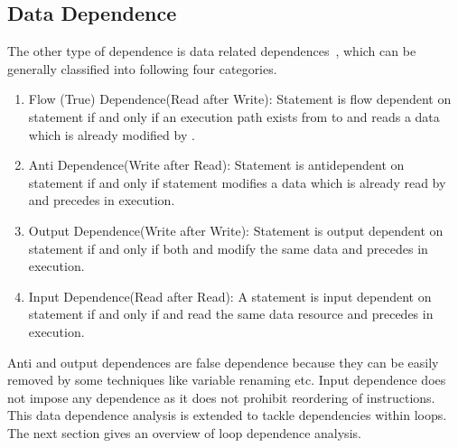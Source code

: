 \subsection{Data Dependence}
The other type of dependence is data related dependences~\cite{Maydan91, Lam92, Kennedy01Optimizing}, which can be generally  
classified into following four categories.
\begin{enumerate}
\item Flow (True) Dependence(Read after Write): Statement  is flow dependent on statement 
 if and only if an execution path exists from  to  and 
 reads a data which is already modified by . 

\item Anti Dependence(Write after Read): Statement  is antidependent on statement 
 if and only if statement  modifies a data which is already read by  and  precedes  in execution. 

\item Output Dependence(Write after Write): Statement  is output dependent on statement 
 if and only if both  and  modify the same data and  precedes  in execution.

\item Input Dependence(Read after Read): A statement  is input dependent on statement 
 if and only if  and  read the same data resource and  precedes  in execution.
\end{enumerate}
Anti and output dependences are false dependence because they can be easily removed by some techniques like variable renaming etc. Input dependence does not impose any dependence as it does not prohibit reordering of instructions. This data dependence 
analysis is extended to tackle dependencies within loops. The next section gives an 
overview of loop dependence analysis. 
